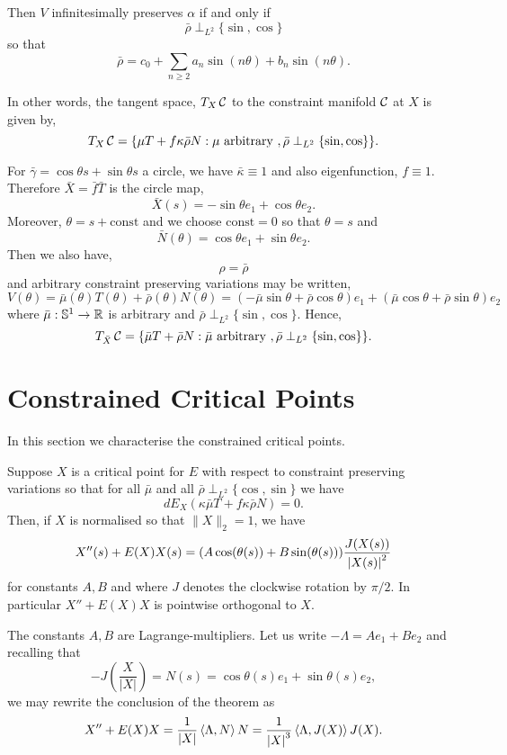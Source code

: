 \documentclass[12pt]{article}
\begin{document}
Then \(V\) infinitesimally preserves \(\alpha\) if and only if
\[
\bar{\rho} \perp_{L^2} \{\sin, \cos\}
\]
so that
\[
\bar{\rho} = c_0 + \sum_{n\geq 2} a_n \sin(n \theta) + b_n \sin(n \theta).
\]

In other words, the tangent space, \(T_X \operatorname{\mathcal{C}}\) to the constraint manifold \(\operatorname{\mathcal{C}}\) at \(X\) is given by,
\[
T_X \operatorname{\mathcal{C}} = \{\mu T + f\kappa\bar{\rho} N : \mu \text{ arbitrary }, \bar{\rho} \perp_{L^2} \{\sin, \cos\}\}.
\]

For \(\bar{\gamma} = \cos\theta s + \sin \theta s\) a circle, we have \(\bar{\kappa} \equiv 1\) and also eigenfunction, \(f \equiv 1\). Therefore \(\bar{X} = \bar{f} \bar{T}\) is the circle map,
\[
\bar{X}(s) = -\sin\theta e_1 + \cos\theta e_2.
\]
Moreover, \(\theta = s + \text{const}\) and we choose \(\text{const} = 0\) so that \(\theta = s\) and
\[
\bar{N}(\theta) = \cos\theta e_1 + \sin\theta e_2.
\]
Then we also have,
\[
\rho = \bar{\rho}
\]
and arbitrary constraint preserving variations may be written,
\[
V(\theta) = \bar{\mu}(\theta) T(\theta) + \bar{\rho}(\theta) N(\theta) = (- \bar{\mu}\sin\theta + \bar{\rho} \cos\theta) e_1 + (\bar{\mu}\cos\theta + \bar{\rho}\sin\theta) e_2
\]
where \(\bar{\mu} : \operatorname{\mathbb{S}^1} \to \operatorname{\mathbb{R}}\) is arbitrary and \(\bar{\rho} \perp_{L^2} \{\sin, \cos\}\). Hence,
\[
T_{\bar{X}} \operatorname{\mathcal{C}} = \{\bar{\mu} T + \bar{\rho} N : \bar{\mu} \text{ arbitrary }, \bar{\rho} \perp_{L^2} \{\sin, \cos\}\}.
\]

\section{Constrained Critical Points}

In this section we characterise the constrained critical points.

\begin{thm}
\label{thm:constrained_critical}
Suppose \(X\) is a critical point for \(E\) with respect to constraint preserving variations so that for all \(\bar{\mu}\) and all \(\bar{\rho} \perp_{L^2} \{\cos, \sin\}\) we have
\[
dE_X(\kappa\bar{\mu} T + f\kappa \bar{\rho} N) = 0.
\]
Then, if \(X\) is normalised so that \(\|X\|_2 = 1\), we have
\[
X''(s) + E(X) X(s) = (A \cos(\theta(s)) + B \sin(\theta(s))) \frac{J(X(s))}{\left|{X(s)}\right|^2}
\]
for constants \(A, B\) and where \(J\) denotes the clockwise rotation by \(\pi/2\). In particular \(X'' + E(X) X\) is pointwise orthogonal to \(X\).
\end{thm}

\begin{rem}
The constants \(A, B\) are Lagrange-multipliers. Let us write \(-\Lambda = A e_1 + B e_2\) and recalling that
\[
-J\left(\frac{X}{|X|}\right) = N(s) = \cos\theta(s) e_1 + \sin\theta(s) e_2,
\]
we may rewrite the conclusion of the theorem as
\begin{equation}
\label{eq:constrained_EL}
X'' + E(X) X = \frac{1}{\left|{X}\right|} \left\langle{\Lambda},{N}\right\rangle N = \frac{1}{\left|{X}\right|^3} \left\langle{\Lambda},{J(X)}\right\rangle J(X).
\end{equation}
\end{rem}
\end{document}

